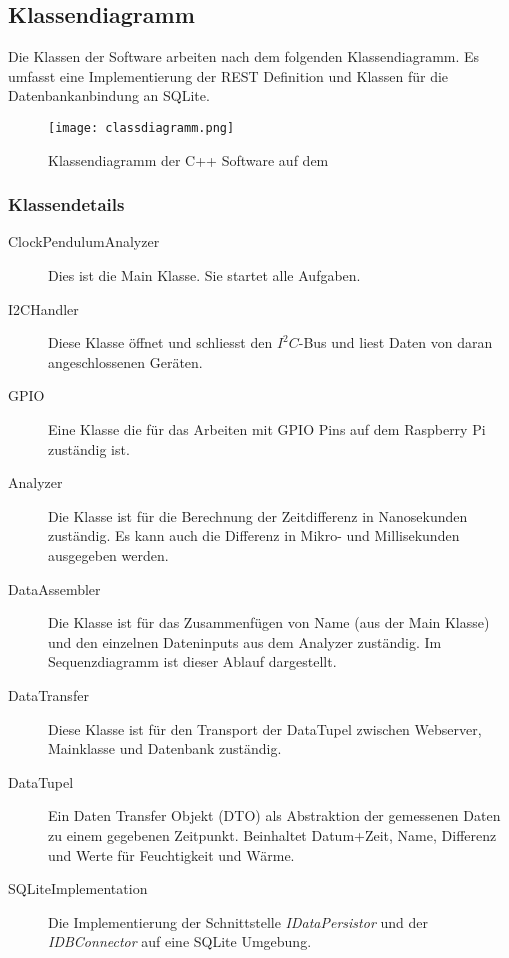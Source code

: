 \subsection{Klassendiagramm}
Die Klassen der Software arbeiten nach dem folgenden Klassendiagramm. Es umfasst eine Implementierung der REST Definition und Klassen für die Datenbankanbindung an SQLite.
\begin{figure}[H]
    \centering
    \texttt{[image: classdiagramm.png]}
    \caption{Klassendiagramm der C++ Software auf dem \rpi}
\end{figure}
\subsubsection{Klassendetails}
	\begin{description}
        \item[ClockPendulumAnalyzer] Dies ist die Main Klasse. Sie startet alle Aufgaben.
        \item[I2CHandler] Diese Klasse öffnet und schliesst den $I^2C$-Bus und liest Daten von daran angeschlossenen Geräten.
        \item[GPIO] Eine Klasse die für das Arbeiten mit GPIO Pins auf dem Raspberry Pi zuständig ist.
        \item[Analyzer] Die Klasse ist für die Berechnung der Zeitdifferenz in Nanosekunden zuständig. Es kann auch die Differenz in Mikro- und Millisekunden ausgegeben werden.
        \item[DataAssembler] Die Klasse ist für das Zusammenfügen von Name (aus der Main Klasse) und den einzelnen Dateninputs aus dem Analyzer zuständig. Im Sequenzdiagramm ist dieser Ablauf dargestellt. 
        \item[DataTransfer] Diese Klasse ist für den Transport der DataTupel zwischen Webserver, Mainklasse und Datenbank zuständig.
        \item[DataTupel] Ein Daten Transfer Objekt (DTO) als Abstraktion der gemessenen Daten zu einem gegebenen Zeitpunkt. Beinhaltet Datum+Zeit, Name, Differenz und Werte für Feuchtigkeit und Wärme.
        \item[SQLiteImplementation] Die Implementierung der Schnittstelle \textit{IDataPersistor} und der \textit{IDBConnector} auf eine SQLite Umgebung.
    \end{description}
